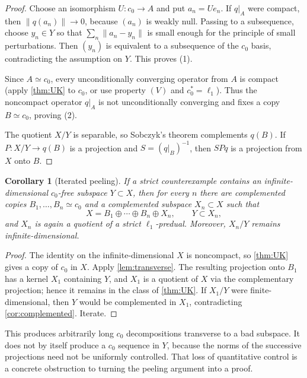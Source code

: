 \documentclass[11pt]{article}
\newtheorem{corollary}[theorem]{Corollary}
\theoremstyle{definition}
\newcommand{\isom}{\simeq}
\begin{document}
\begin{proof}
Choose an isomorphism $U:c_0\to A$ and put $a_n=Ue_n$.  If $q|_A$ were
compact, then $\|q(a_n)\|\to0$, because $(a_n)$ is weakly null.  Passing to a
subsequence, choose $y_n\in Y$ so that
$\sum_n\|a_n-y_n\|$ is small enough for the principle of small perturbations.
Then $(y_n)$ is equivalent to a subsequence of the $c_0$ basis, contradicting
the assumption on $Y$.  This proves (1).

Since $A\isom c_0$, every unconditionally converging operator from $A$ is
compact (apply \cref{thm:UK} to $c_0$, or use property $(V)$ and
$c_0^*=\ell_1$).  Thus the noncompact operator $q|_A$ is not unconditionally
converging and fixes a copy $B\isom c_0$, proving (2).

The quotient $X/Y$ is separable, so Sobczyk's theorem complements $q(B)$.
If $P:X/Y\to q(B)$ is a projection and $S=(q|_B)^{-1}$, then $SPq$ is a
projection from $X$ onto $B$.
\end{proof}

\begin{corollary}[Iterated peeling]\label{cor:peeling}
If a strict counterexample contains an infinite-dimensional $c_0$-free
subspace $Y\subset X$, then for every $n$ there are complemented copies
$B_1,\ldots,B_n\isom c_0$ and a complemented subspace $X_n\subset X$ such
that
\[
    X = B_1\oplus\cdots\oplus B_n\oplus X_n,
    \qquad Y\subset X_n,
\]
and $X_n$ is again a quotient of a strict $\ell_1$-predual.  Moreover,
$X_n/Y$ remains infinite-dimensional.
\end{corollary}

\begin{proof}
The identity on the infinite-dimensional $X$ is noncompact, so
\cref{thm:UK} gives a copy of $c_0$ in $X$.  Apply
\cref{lem:transverse}.  The resulting projection onto $B_1$ has a kernel
$X_1$ containing $Y$, and $X_1$ is a quotient of $X$ via the complementary
projection; hence it remains in the class of \cref{thm:UK}.  If $X_1/Y$ were
finite-dimensional, then $Y$ would be complemented in $X_1$, contradicting
\cref{cor:complemented}.  Iterate.
\end{proof}

This produces arbitrarily long $c_0$ decompositions transverse to a bad
subspace.  It does not by itself produce a $c_0$ sequence in $Y$, because the
norms of the successive projections need not be uniformly controlled.  That
loss of quantitative control is a concrete obstruction to turning the
peeling argument into a proof.
\end{document}
